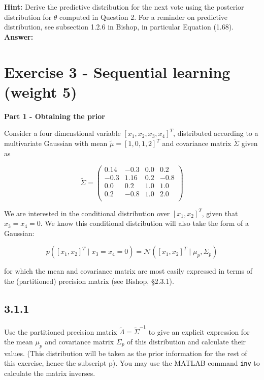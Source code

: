 \documentclass[a4paper]{article}
\begin{document}
\textbf{Hint:} Derive the predictive distribution for the next vote using the posterior distribution for $\theta$ computed in Question 2. For a reminder on predictive distribution, see subsection 1.2.6 in Bishop, in particular Equation (1.68).\\


\textbf{Answer:}\\





\section*{Exercise 3 - Sequential learning (weight 5)}


\textbf{Part 1 - Obtaining the prior}

Consider a four dimenstional variable $[x_1, x_2, x_3, x_4]^T$, distributed according to a multivariate Gaussian with mean $\tilde{\mu} = [1,0,1,2]^T$ and covariance matrix $\tilde{\Sigma}$ given as

	
\[ \tilde{\Sigma} = 
	\left(
	\begin{array}{cc|cc}
	0.14 & -0.3 & 0.0 & 0.2 \\
	-0.3 & 1.16 & 0.2 & -0.8 \\
	\hline
	0.0 & 0.2 & 1.0 & 1.0 \\
	0.2 & -0.8 & 1.0 & 2.0 \\	
	\end{array}
	\right)
\]	

We are interested in the conditional distribution over $[x_1,x_2]^T$, given that $x_3 = x_4 = 0$. We know this conditional distribution will also take the form of a Gaussian:

\begin{equation}
p([x_1,x_2]^T \; | \; x_3 = x_4 = 0) = \mathcal{N}([x_1,x_2]^T \; | \; \mu_p, \Sigma_p) \label{eq:part1}
\end{equation}

for which the mean and covariance matrix are most easily expressed in terms of the (partitioned) precision matrix (see Bishop, §2.3.1).



\subsection*{3.1.1}

Use the partitioned precision matrix $\tilde{\Lambda} = \tilde{\Sigma}^{-1}$ to give an explicit expression for the mean $\mu_p$ and covariance matrix $\Sigma_p$ of this distribution and calculate their values. (This distribution will be taken as the prior information for the rest of this exercise, hence the subscript p). You may use the MATLAB command \texttt{inv} to calculate the matrix inverses.\\
\end{document}

